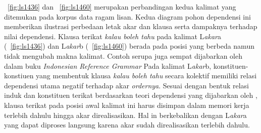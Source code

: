 \pic~\ref{fig:ls1436} dan \pic~\ref{fig:ls1460} merupakan perbandingan kedua kalimat yang ditemukan pada korpus data ragam lisan. Kedua diagram pohon dependensi ini memberikan ilustrasi perbedaan letak akar dan klausa serta dampaknya terhadap nilai dependensi. Klausa terikat \textit{kalau boleh tahu} pada kalimat L\textit{akar}a (\pic~\ref{fig:ls1436}) dan L\textit{akar}b (\pic~\ref{fig:ls1460}) berada pada posisi yang berbeda namun tidak mengubah makna kalimat. Contoh serupa juga sempat dijabarkan oleh \cite{sneddon2010indonesian} dalam buku \textit{Indonesian Reference Grammar} Pada kalimat L\textit{akar}b, konstituen-konstiuen yang membentuk klausa \textit{kalau boleh tahu} secara kolektif memiliki relasi dependensi utama negatif terhadap akar \textit{ordernya}. Sesuai dengan bentuk relasi induk dan konstituen terikat berdasarkan teori dependensi yang dijabarkan oleh \cite{tesniere1959elements}, klausa terikat pada posisi awal kalimat ini harus disimpan dalam memori kerja terlebih dahulu hingga akar direalisasikan. Hal in berkebalikan dengan L\textit{akar}a yang dapat diproses langsung karena akar sudah direalisasikan terlebih dahulu. 

